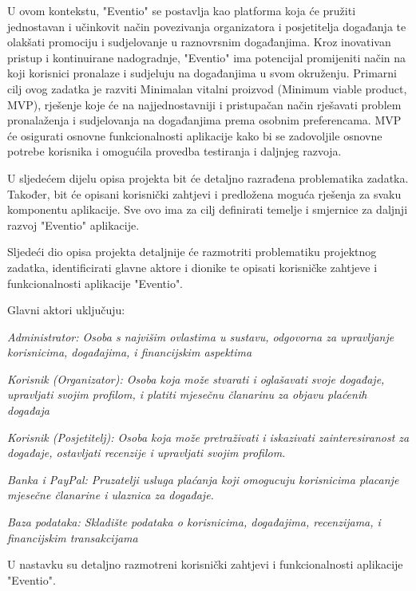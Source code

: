 		U ovom kontekstu, "Eventio" se postavlja kao platforma koja će pružiti jednostavan i učinkovit način povezivanja organizatora i posjetitelja događanja te olakšati promociju i sudjelovanje u raznovrsnim događanjima. Kroz inovativan pristup i kontinuirane nadogradnje, "Eventio" ima potencijal promijeniti način na koji korisnici pronalaze i sudjeluju na događanjima u svom okruženju.
		Primarni cilj ovog zadatka je razviti Minimalan vitalni proizvod (Minimum viable product, MVP), rješenje koje će na najjednostavniji i pristupačan način rješavati problem pronalaženja i sudjelovanja na događanjima prema osobnim preferencama. MVP će osigurati osnovne funkcionalnosti aplikacije kako bi se zadovoljile osnovne potrebe korisnika i omogućila provedba testiranja i daljnjeg razvoja.
		
		U sljedećem dijelu opisa projekta bit će detaljno razrađena problematika zadatka. Također, bit će opisani korisnički zahtjevi i predložena moguća rješenja za svaku komponentu aplikacije. Sve ovo ima za cilj definirati temelje i smjernice za daljnji razvoj "Eventio" aplikacije.
		
		Sljedeći dio opisa projekta detaljnije će razmotriti problematiku projektnog zadatka, identificirati glavne aktore i dionike te opisati korisničke zahtjeve i funkcionalnosti aplikacije "Eventio".
		
		Glavni aktori uključuju:
		\begin{packed_item}
			\item \textit{Administrator: Osoba s najvišim ovlastima u sustavu, odgovorna za upravljanje korisnicima, događajima, i financijskim aspektima}
			\item \textit{Korisnik (Organizator): Osoba koja može stvarati i oglašavati svoje događaje, upravljati svojim profilom, i platiti mjesečnu članarinu za objavu plaćenih događaja}
			\item \textit{Korisnik (Posjetitelj): Osoba koja može pretraživati i iskazivati zainteresiranost za događaje, ostavljati recenzije i upravljati svojim profilom.}
			\item \textit{Banka i PayPal: Pruzatelji usluga plaćanja koji omogucuju korisnicima placanje mjesečne članarine i ulaznica za događaje.}
			\item \textit{Baza podataka: Skladište podataka o korisnicima, događajima, recenzijama, i financijskim transakcijama}
		\end{packed_item}
		
		U nastavku su detaljno razmotreni korisnički zahtjevi i funkcionalnosti aplikacije "Eventio".
		
